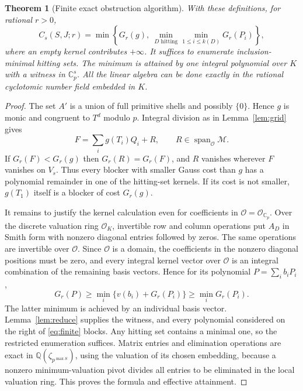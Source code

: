 \documentclass[11pt]{article}
\newtheorem{theorem}{Theorem}[section]
\theoremstyle{definition}
\newcommand{\Cp}{\mathbb C_p}
\newcommand{\OO}{\mathcal O}
\begin{document}
\begin{theorem}[Finite exact obstruction algorithm]\label{thm:finite}
With these definitions, for rational $r>0$,
\begin{equation}\label{eq:finite}
 C_s(S,J;r)=\min\left\{G_r(g),\ \min_{D\text{ hitting}}\min_{1\le i\le k(D)}G_r(P_i)\right\},
\end{equation}
where an empty kernel contributes $+\infty$. It suffices to enumerate inclusion-minimal hitting sets. The minimum is attained by one integral polynomial over $K$ with a witness in $\Cp^s$. All the linear algebra can be done exactly in the rational cyclotomic number field embedded in $K$.
\end{theorem}
\begin{proof}
The set $A'$ is a union of full primitive shells and possibly $\{0\}$. Hence $g$ is monic and congruent to $T^d$ modulo $p$. Integral division as in Lemma~\ref{lem:grid} gives
\[
 F=\sum_i g(T_i)Q_i+R,\qquad R\in\operatorname{span}_{\OO}\mathcal M.
\]
If $G_r(F)<G_r(g)$ then $G_r(R)=G_r(F)$, and $R$ vanishes wherever $F$ vanishes on $V_s$. Thus every blocker with smaller Gauss cost than $g$ has a polynomial remainder in one of the hitting-set kernels. If its cost is not smaller, $g(T_1)$ itself is a blocker of cost $G_r(g)$.

It remains to justify the kernel calculation even for coefficients in $\OO=\OO_{\Cp}$. Over the discrete valuation ring $\OO_K$, invertible row and column operations put $A_D$ in Smith form with nonzero diagonal entries followed by zeros. The same operations are invertible over $\OO$. Since $\OO$ is a domain, the coefficients in the nonzero diagonal positions must be zero, and every integral kernel vector over $\OO$ is an integral combination of the remaining basis vectors. Hence for its polynomial $P=\sum_i b_iP_i$,
\[
 G_r(P)\ge\min_i\{v(b_i)+G_r(P_i)\}\ge\min_i G_r(P_i).
\]
The latter minimum is achieved by an individual basis vector. Lemma~\ref{lem:reduce} supplies the witness, and every polynomial considered on the right of \eqref{eq:finite} blocks. Any hitting set contains a minimal one, so the restricted enumeration suffices. Matrix entries and elimination operations are exact in $\mathbb Q(\zeta_{p^{\max S}})$, using the valuation of its chosen embedding, because a nonzero minimum-valuation pivot divides all entries to be eliminated in the local valuation ring. This proves the formula and effective attainment.
\end{proof}
\end{document}
